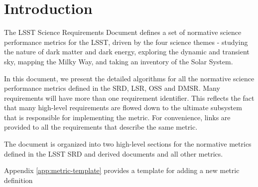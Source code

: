 \section{Introduction}

The LSST Science Requirements Document defines a set of normative science performance metrics for the LSST, driven by the four science themes - studying the nature of dark matter and dark energy, exploring the dynamic and transient sky, mapping the Milky Way, and taking an inventory of the Solar System\cite{2019ApJ...873..111I}.

In this document, we present the detailed algorithms for all the normative science performance metrics defined in the SRD, LSR, OSS and DMSR.
Many requirements will have more than one requirement identifier.
This reflects the fact that many high-level requirements are flowed down to the ultimate subsystem that is responsible for implementing the metric. 
For convenience, links are provided to all the requirements that describe the same metric. 

The document is organized into two high-level sections for the normative metrics defined in the LSST SRD and derived documents and all other metrics. 

Appendix \ref{app:metric-template} provides a template for adding a new metric definition

